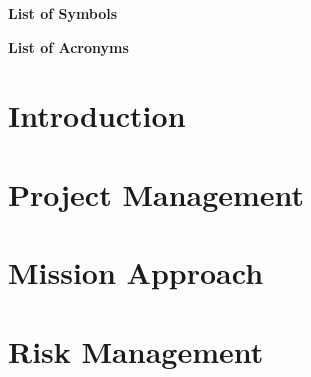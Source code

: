 \documentclass[11pt]{report}
\begin{document}
%
%



%
%



%
%

\newpage
{}
\tableofcontents
\newpage
{}
\listoffigures
\newpage
{}
\listoftables

%
%

\newpage
{}
\Large{\textbf{List of Symbols}}
\small


%
%

\newpage
{}
\Large{\textbf{List of Acronyms}}
\small


%
%



%
%

\chapter{Introduction}
\label{chap:intro}


%
%

\chapter{Project Management}
\label{chap:project_management}


%
%

\chapter{Mission Approach}
\label{chap:mission_approach}


%
%

\chapter{Risk Management}
\label{chap:risk_management}

\end{document}
